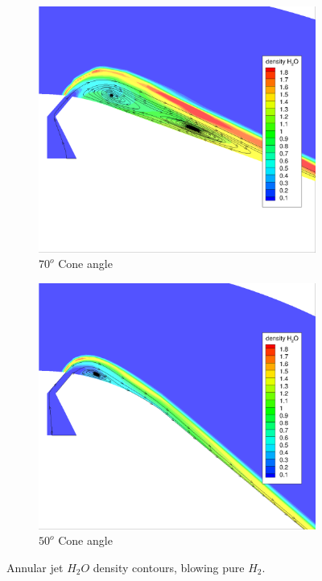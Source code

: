 \begin{figure}[h!]
  \centering
  \begin{subfigure}{0.45\textwidth}
    \includegraphics[width=\textwidth]{figures/srp/70deg-water.png}
    \caption{$70^o$ Cone angle}
    \label{fig:70deg-water-contour}
  \end{subfigure}
  \begin{subfigure}{0.45\textwidth}
    \includegraphics[width=\textwidth]{figures/srp/50deg-water.png}
    \caption{$50^o$ Cone angle}
    \label{fig:50deg-water-contour}
  \end{subfigure}
  \caption{Annular jet $H_2 O$ density contours, blowing pure $H_2$.}
  \label{fig:cone-angle-water}
\end{figure}

